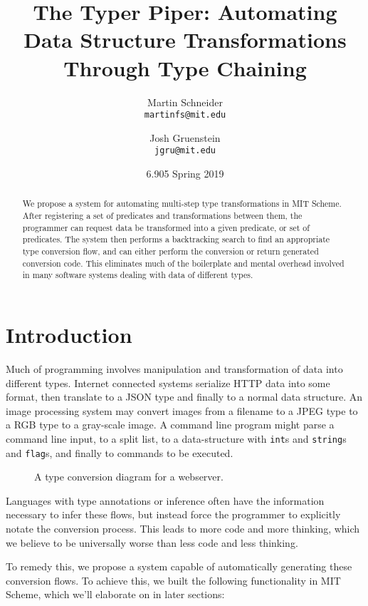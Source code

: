 \documentclass[letterpaper]{article}
\title{The Typer Piper: Automating Data Structure Transformations Through Type Chaining}
\author{
  Martin Schneider\\
  \texttt{martinfs@mit.edu} \and
  Josh Gruenstein\\
  \texttt{jgru@mit.edu}
}
\date{6.905 Spring 2019}
\begin{document}
 
\maketitle

\begin{abstract}
We propose a system for automating multi-step type transformations in MIT Scheme.  After registering a set of predicates and transformations between them, the programmer can request data be transformed into a given predicate, or set of predicates.  The system then performs a backtracking search to find an appropriate type conversion flow, and can either perform the conversion or return generated conversion code.  This eliminates much of the boilerplate and mental overhead involved in many software systems dealing with data of different types.
\end{abstract}

\section{Introduction}

Much of programming involves manipulation and transformation of data into different types.  Internet connected systems serialize HTTP data into some format, then translate to a JSON type and finally to a normal data structure.  An image processing system may convert images from a filename to a JPEG type to a RGB type to a gray-scale image.  A command line program might parse a command line input, to a split list, to a data-structure with \texttt{int}s and \texttt{string}s and \texttt{flag}s, and finally to commands to be executed.

\begin{figure}[h!]
\centering

\resizebox{14cm}{!} {
  
}

\caption{A type conversion diagram for a webserver.}
\label{webserver}
\end{figure}

Languages with type annotations or inference often have the information necessary to infer these flows, but instead force the programmer to explicitly notate the conversion process.  This leads to more code and more thinking, which we believe to be universally worse than less code and less thinking.

To remedy this, we propose a system capable of automatically generating these conversion flows.  To achieve this, we built the following functionality in MIT Scheme, which we'll elaborate on in later sections:
\end{document}
